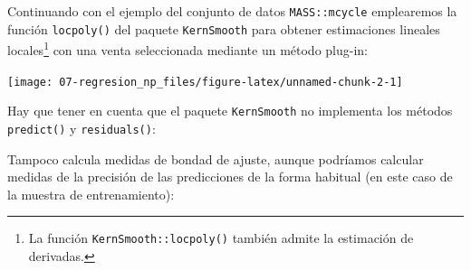 \documentclass[
  spanish,
]{book}
\newenvironment{Shaded}{\begin{snugshade}}{\end{snugshade}}
\newcommand{\CommentTok}[1]{\textcolor[rgb]{0.56,0.35,0.01}{\textit{#1}}}
\newcommand{\DataTypeTok}[1]{\textcolor[rgb]{0.13,0.29,0.53}{#1}}
\newcommand{\KeywordTok}[1]{\textcolor[rgb]{0.13,0.29,0.53}{\textbf{#1}}}
\newcommand{\NormalTok}[1]{#1}
\newcommand{\OperatorTok}[1]{\textcolor[rgb]{0.81,0.36,0.00}{\textbf{#1}}}
\newcommand{\StringTok}[1]{\textcolor[rgb]{0.31,0.60,0.02}{#1}}
\theoremstyle{break}
\theoremstyle{definition}
\theoremstyle{definition}
\theoremstyle{definition}
\theoremstyle{remark}
\begin{document}
Continuando con el ejemplo del conjunto de datos \texttt{MASS::mcycle} emplearemos la función \texttt{locpoly()} del paquete \texttt{KernSmooth} para obtener estimaciones lineales locales\footnote{La función \texttt{KernSmooth::locpoly()} también admite la estimación de derivadas.} con una venta seleccionada mediante un método plug-in:

\begin{Shaded}
\end{Shaded}

\begin{center}\texttt{[image: 07-regresion\_np\_files/figure-latex/unnamed-chunk-2-1]} \end{center}

Hay que tener en cuenta que el paquete \texttt{KernSmooth} no implementa los métodos
\texttt{predict()} y \texttt{residuals()}:

\begin{Shaded}
\end{Shaded}

Tampoco calcula medidas de bondad de ajuste, aunque podríamos calcular medidas de la precisión de las predicciones de la forma habitual (en este caso de la muestra de entrenamiento):
\end{document}
